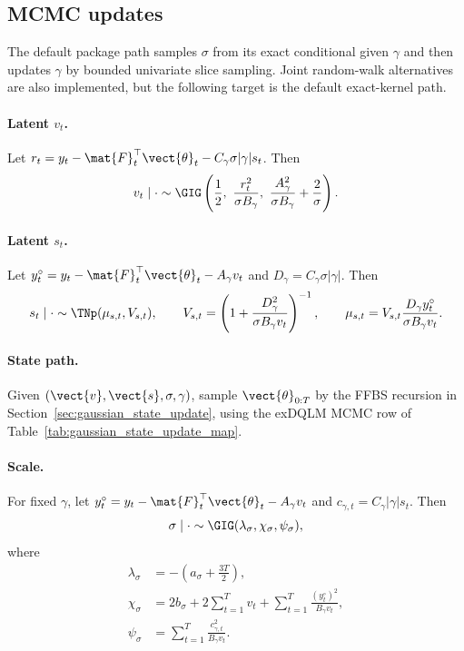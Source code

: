 \subsection{MCMC updates}

The default package path samples $\sigma$ from its exact conditional
given $\gamma$ and then updates $\gamma$ by bounded univariate slice sampling.
Joint random-walk alternatives are also implemented, but the following target
is the default exact-kernel path.

\paragraph{Latent $v_t$.}
Let
$r_t=y_t-\mat{F}_t^\top\vect{\theta}_t-C_\gamma\sigma|\gamma|s_t$. Then
\begin{equation}
v_t\mid\cdot
\sim
\GIG\left(
\frac{1}{2},\
\frac{r_t^2}{\sigma B_\gamma},\
\frac{A_\gamma^2}{\sigma B_\gamma}+\frac{2}{\sigma}
\right).
\label{eq:dyn_exdqlm_v_cond}
\end{equation}

\paragraph{Latent $s_t$.}
Let $y_t^\circ=y_t-\mat{F}_t^\top\vect{\theta}_t-A_\gamma v_t$ and
$D_\gamma=C_\gamma\sigma|\gamma|$. Then
\begin{equation}
s_t\mid\cdot\sim\TNp(\mu_{s,t},V_{s,t}),
\qquad
V_{s,t}=\left(1+\frac{D_\gamma^2}{\sigma B_\gamma v_t}\right)^{-1},
\qquad
\mu_{s,t}=V_{s,t}\frac{D_\gamma y_t^\circ}{\sigma B_\gamma v_t}.
\label{eq:dyn_exdqlm_s_cond}
\end{equation}

\paragraph{State path.}
Given $(\vect{v},\vect{s},\sigma,\gamma)$, sample
$\vect{\theta}_{0:T}$ by the FFBS recursion in
Section~\ref{sec:gaussian_state_update}, using the exDQLM MCMC row of
Table~\ref{tab:gaussian_state_update_map}.

\paragraph{Scale.}
For fixed $\gamma$, let $y_t^\circ=y_t-\mat{F}_t^\top\vect{\theta}_t-A_\gamma v_t$
and $c_{\gamma,t}=C_\gamma|\gamma|s_t$. Then
\begin{equation}
\sigma\mid\cdot
\sim
\GIG(\lambda_\sigma,\chi_\sigma,\psi_\sigma),
\label{eq:dyn_exdqlm_sigma_cond}
\end{equation}
where
\begin{align}
\lambda_\sigma &= -\left(a_\sigma+\frac{3T}{2}\right), \\
\chi_\sigma &= 2b_\sigma+2\sum_{t=1}^T v_t+
\sum_{t=1}^T\frac{(y_t^\circ)^2}{B_\gamma v_t},\\
\psi_\sigma &= \sum_{t=1}^T\frac{c_{\gamma,t}^2}{B_\gamma v_t}.
\end{align}

